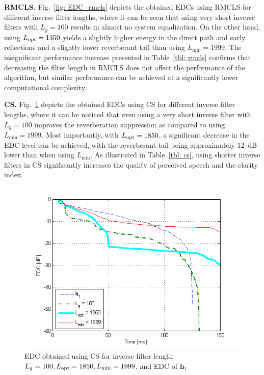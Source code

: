 \documentclass{article}
\begin{document}
\smallskip \noindent \textbf{RMCLS.} \enspace Fig.~\ref{fig: EDC_rmcls} depicts the obtained EDCs using RMCLS for different inverse filter lengths, where it can be seen that using very short inverse filters with $L_g = 100$ results in almost no system equalization. On the other hand, using $L_{\rm opt} = 1350$ yields a slightly higher energy in the direct path and early reflections and a slightly lower reverberant tail than using $L_{\min} = 1999$. The insignificant performance increase presented in Table~\ref{tbl: rmcls} confirms that decreasing the filter length in RMCLS does not affect the performance of the algorithm, but similar performance can be achieved at a significantly lower computational complexity.

\smallskip \noindent \textbf{CS.} \enspace Fig.~\ref{fig: EDC_cs} depicts the obtained EDCs using CS for different inverse filter lengths, where it can be noticed that even using a very short inverse filter with $L_g = 100$ improves the reverberation suppression as compared to using $L_{\min} = 1999$. 
Most importantly, with $L_{\rm opt} = 1850$, a significant decrease in the EDC level can be achieved, with the reverberant tail being approximately $12$~dB lower than when using $L_{\min}$. 
As illustrated in Table~\ref{tbl: cs}, using shorter inverse filters in CS significantly increases the quality of perceived speech and the clarity index.
\begin{figure}[t!]
\includegraphics[scale=0.6]{EUSIPCOplots/EDC_cs_vs_Lg_sys_5_Cm_-33}
  \vspace{-0.6cm}
\caption{EDC obtained using CS for inverse filter length $L_g = 100, L_{\rm opt} = 1850, L_{\min} = 1999$, and EDC of $\mathbf{h}_1$}
\label{fig: EDC_cs}
\vspace{-0.5cm}
\end{figure}
\end{document}
